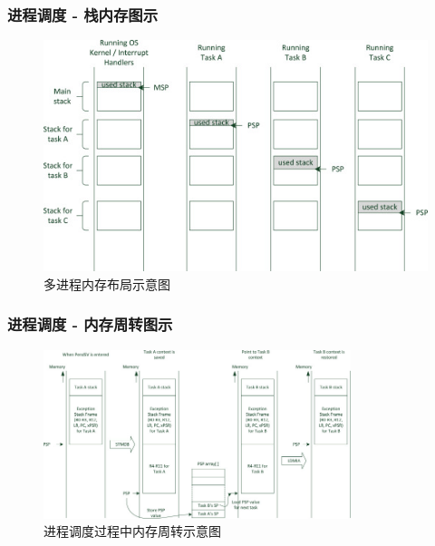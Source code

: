 \documentclass[aspectratio=169]{ctexbeamer}
\begin{document}
\begin{frame}

    \frametitle{进程调度 - 栈内存图示}

    \begin{figure}
        \centering
            \captionsetup{font=song}
            \includegraphics[height=0.60\paperheight, keepaspectratio]{3-s2.0-B9780124080829000105-f10-01-9780124080829.jpg}
            \caption{多进程内存布局示意图}
    \end{figure}

\end{frame}

\begin{frame}

    \frametitle{进程调度 - 内存周转图示}

    \begin{figure}
        \centering
            \captionsetup{font=song}
            \includegraphics[width=0.80\textwidth, keepaspectratio]{3-s2.0-B9780124080829000105-f10-10-9780124080829.jpg}
            \caption{进程调度过程中内存周转示意图}
    \end{figure}

\end{frame}
\end{document}
